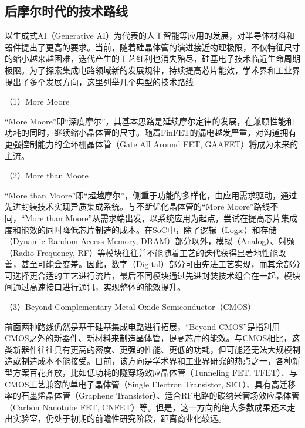 \subsection{后摩尔时代的技术路线}

以生成式AI（Generative AI）为代表的人工智能等应用的发展，对半导体材料和器件提出了更高的要求。当前，随着硅晶体管的演进接近物理极限，不仅特征尺寸的缩小越来越困难，迭代产生的工艺红利也消失殆尽，硅基电子技术临近生命周期极限。为了探索集成电路领域新的发展规律，持续提高芯片能效，学术界和工业界提出了多个发展方向，这里列举几个典型的技术路线%

（1）More Moore\cite{more_moore}

“More Moore”即“深度摩尔”，其基本思路是延续摩尔定律的发展，在兼顾性能和功耗的同时，继续缩小晶体管的尺寸。随着FinFET的漏电越发严重，对沟道拥有更强控制能力的全环栅晶体管（Gate All Around FET, GAAFET）将成为未来的主流\cite{GAA}。

（2）More than Moore\cite{more_than_moore}

“More than Moore”即“超越摩尔”，侧重于功能的多样化，由应用需求驱动，通过先进封装技术实现异质集成系统。与不断优化晶体管的“More Moore”路线不同，“More than Moore”从需求端出发，以系统应用为起点，尝试在提高芯片集成度和能效的同时降低芯片制造的成本。在SoC中，除了逻辑（Logic）和存储（Dynamic Random Access Memory, DRAM）部分以外，模拟（Analog）、射频（Radio Frequency, RF）等模块往往并不能随着工艺的迭代获得显著地性能改善，甚至可能会变差。因此，数字（Digital）部分可由先进工艺实现，而其余部分可选择更合适的工艺进行流片，最后不同模块通过先进封装技术组合在一起，模块间通过高速接口进行通讯，实现整体的能效提升。


（3）Beyond Complementary Metal Oxide Semiconductor（CMOS）\cite{beyond_cmos}

前面两种路线仍然是基于硅基集成电路进行拓展，“Beyond CMOS”是指利用CMOS之外的新器件、新材料来制造晶体管，提高芯片的能效。与CMOS相比，这类新器件往往具有更高的密度、更强的性能、更低的功耗，但可能还无法大规模制造或制造成本不能接受。目前，该方向是学术界和工业界研究的热点之一，各种新型方案百花齐放，比如低功耗的隧穿场效应晶体管（Tunneling FET, TFET）\cite{TFET}、与CMOS工艺兼容的单电子晶体管（Single Electron Transistor, SET）\cite{SET}、具有高迁移率的石墨烯晶体管（Graphene Transistor）\cite{Graphene_transistor}、适合RF电路的碳纳米管场效应晶体管（Carbon Nanotube FET, CNFET）\cite{Carbon_Nanotube_FET}等。但是，这一方向的绝大多数成果还未走出实验室，仍处于初期的前瞻性研究阶段，距离商业化较远。

